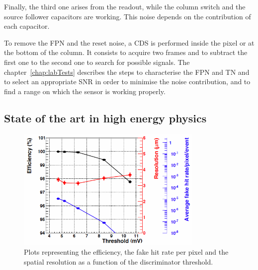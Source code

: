     Finally, the third one arises from the readout, while the column switch and the source follower capacitors are working.
    This noise depends on the contribution of each capacitor.
    
    To remove the \gls{FPN} and the reset noise, a \gls{CDS} is performed inside the pixel or at the bottom of the column.
    It consists to acquire two frames and to subtract the first one to the second one to search for possible signals.
    The chapter~\ref{chap:labTests} describes the steps to characterise the \gls{FPN} and \gls{TN} and to select an appropriate \gls{SNR} in order to minimise the noise contribution, and to find a range on which the sensor is working properly.


    \subsection{State of the art in high energy physics}
    \label{subsec:Mi26}

    \begin{figure}
      \centering
      \includegraphics[width=0.8\textwidth]{Pictures/vxd/MIMOSA26_chip26_HR15_20deg}
      \caption{Plots representing the efficiency, the fake hit rate per pixel and the spatial resolution as a function of the discriminator threshold.}
    \end{figure}

